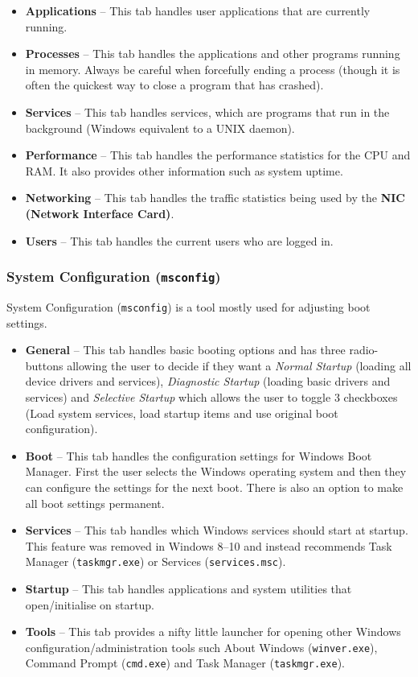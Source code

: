 \documentclass{article}
\begin{document}
\begin{itemize}
    \item \textbf{Applications} -- This tab handles user applications that are currently running.
    \item \textbf{Processes} -- This tab handles the applications and other programs running in memory. Always be careful when forcefully ending a process (though it is often the quickest way to close a program that has crashed).
    \item \textbf{Services} -- This tab handles services, which are programs that run in the background (Windows equivalent to a UNIX daemon).
    \item \textbf{Performance} -- This tab handles the performance statistics for the CPU and RAM. It also provides other information such as system uptime.
    \item \textbf{Networking} -- This tab handles the traffic statistics being used by the \textbf{NIC (Network Interface Card)}.
    \item \textbf{Users} -- This tab handles the current users who are logged in.
\end{itemize}

\subsubsection{System Configuration (\texttt{msconfig})}

System Configuration (\texttt{msconfig}) is a tool mostly used for adjusting boot settings.

\begin{itemize}
    \item \textbf{General} -- This tab handles basic booting options and has three radio-buttons allowing the user to decide if they want a \textit{Normal Startup} (loading all device drivers and services), \textit{Diagnostic Startup} (loading basic drivers and services) and \textit{Selective Startup} which allows the user to toggle 3 checkboxes (Load system services, load startup items and use original boot configuration).
    \item \textbf{Boot} -- This tab handles the configuration settings for Windows Boot Manager. First the user selects the Windows operating system and then they can configure the settings for the next boot. There is also an option to make all boot settings permanent.
    \item \textbf{Services} -- This tab handles which Windows services should start at startup. This feature was removed in Windows 8--10 and instead recommends Task Manager (\texttt{taskmgr.exe}) or Services (\texttt{services.msc}).
    \item \textbf{Startup} -- This tab handles applications and system utilities that open/initialise on startup.
    \item \textbf{Tools} -- This tab provides a nifty little launcher for opening other Windows configuration/administration tools such About Windows (\texttt{winver.exe}), Command Prompt (\texttt{cmd.exe}) and Task Manager (\texttt{taskmgr.exe}).
\end{itemize}
\end{document}
